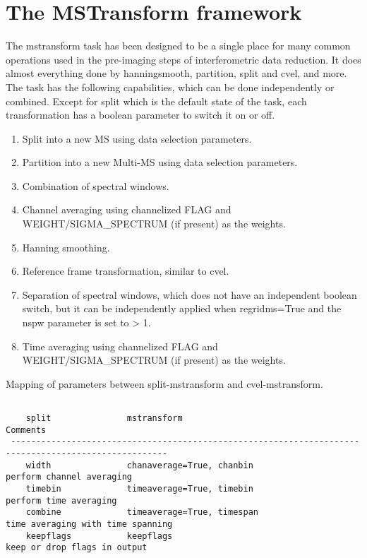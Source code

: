 

\section{The MSTransform framework}\label{Sec:Running}
The mstransform task has been designed to be a single place for many
common operations used in the pre-imaging steps of interferometric
data reduction. It does almost everything done by hanningsmooth,
partition, split and cvel, and more. The task has the following capabilities,
which can be done independently or combined. Except for split which is the default 
state of the task, each transformation has a boolean parameter to switch it on
or off.

\begin{enumerate}
\item Split into a new MS using data selection parameters.
\item Partition into a new Multi-MS using data selection parameters.
\item Combination of spectral windows.
\item Channel averaging using channelized FLAG and WEIGHT/SIGMA\_SPECTRUM (if
present) as the weights.
\item Hanning smoothing.
\item Reference frame transformation, similar to cvel.
\item Separation of spectral windows, which does not have an independent
boolean switch, but it can be independently applied when regridms=True and
the nspw parameter is set to > 1.
\item Time averaging using channelized FLAG and WEIGHT/SIGMA\_SPECTRUM (if
present) as the weights.

\end{enumerate}

Mapping of parameters between split-mstransform and cvel-mstransform.

\begin{verbatim}

    split               mstransform                                      Comments
 -----------------------------------------------------------------------------------------------------
    width               chanaverage=True, chanbin                        perform channel averaging
    timebin             timeaverage=True, timebin                        perform time averaging
    combine             timeaverage=True, timespan                       time averaging with time spanning
    keepflags           keepflags                                        keep or drop flags in output


\end{verbatim}



